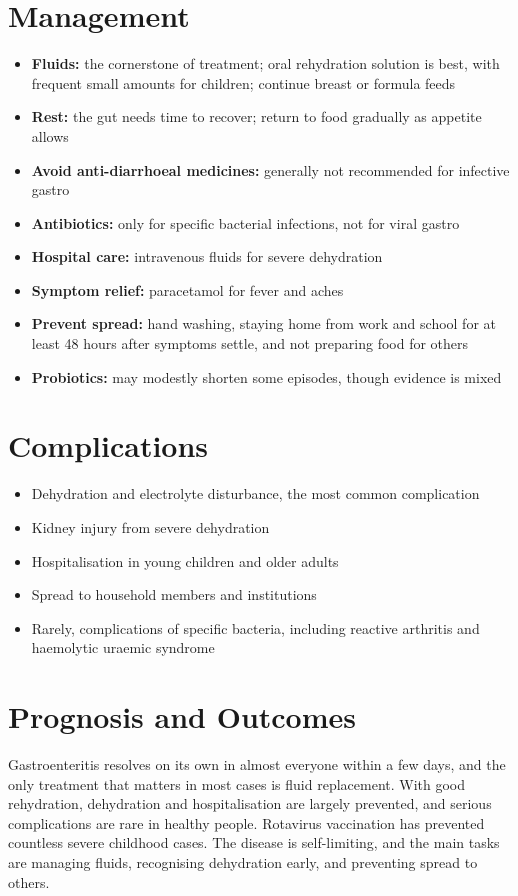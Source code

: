 \section*{Management}
\begin{itemize}
    \item \textbf{Fluids:} the cornerstone of treatment; oral rehydration solution is best, with frequent small amounts for children; continue breast or formula feeds
    \item \textbf{Rest:} the gut needs time to recover; return to food gradually as appetite allows
    \item \textbf{Avoid anti-diarrhoeal medicines:} generally not recommended for infective gastro
    \item \textbf{Antibiotics:} only for specific bacterial infections, not for viral gastro
    \item \textbf{Hospital care:} intravenous fluids for severe dehydration
    \item \textbf{Symptom relief:} paracetamol for fever and aches
    \item \textbf{Prevent spread:} hand washing, staying home from work and school for at least 48 hours after symptoms settle, and not preparing food for others
    \item \textbf{Probiotics:} may modestly shorten some episodes, though evidence is mixed
\end{itemize}

\section*{Complications}
\begin{itemize}
    \item Dehydration and electrolyte disturbance, the most common complication
    \item Kidney injury from severe dehydration
    \item Hospitalisation in young children and older adults
    \item Spread to household members and institutions
    \item Rarely, complications of specific bacteria, including reactive arthritis and haemolytic uraemic syndrome
\end{itemize}

\section*{Prognosis and Outcomes}
Gastroenteritis resolves on its own in almost everyone within a few days, and the only treatment that matters in most cases is fluid replacement. With good rehydration, dehydration and hospitalisation are largely prevented, and serious complications are rare in healthy people. Rotavirus vaccination has prevented countless severe childhood cases. The disease is self-limiting, and the main tasks are managing fluids, recognising dehydration early, and preventing spread to others.

